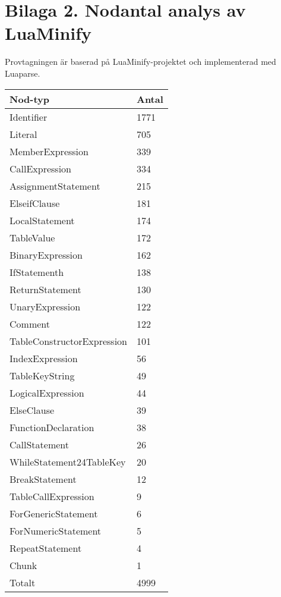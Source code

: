\clearpage
{}
\section*{Bilaga 2. Nodantal analys av LuaMinify}

Provtagningen är baserad på LuaMinify-projektet och implementerad med Luaparse.

\begin{table}[ht]
  \begin{tabular}{l l}
    Nod-typ & Antal \\
    \hline
    Identifier & 1771 \\
    Literal & 705 \\
    MemberExpression & 339 \\
    CallExpression & 334 \\
    AssignmentStatement & 215 \\
    ElseifClause & 181 \\
    LocalStatement & 174 \\
    TableValue & 172 \\
    BinaryExpression & 162 \\
    IfStatementh & 138 \\
    ReturnStatement & 130 \\
    UnaryExpression & 122 \\
    Comment & 122 \\
    TableConstructorExpression & 101 \\
    IndexExpression & 56 \\
    TableKeyString & 49 \\
    LogicalExpression & 44 \\
    ElseClause & 39 \\
    FunctionDeclaration & 38 \\
    CallStatement & 26 \\
    WhileStatement24TableKey & 20 \\
    BreakStatement & 12 \\
    TableCallExpression & 9 \\
    ForGenericStatement & 6 \\
    ForNumericStatement & 5 \\
    RepeatStatement & 4 \\
    Chunk & 1 \\
    \hline
    Totalt & 4999
  \end{tabular}
\end{table}

